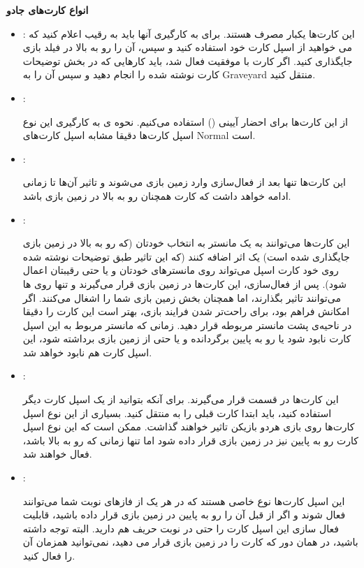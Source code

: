 \documentclass[]{article}
\begin{document}
\textbf{انواع کارت‌های جادو}

\begin{itemize}
	\item {}:
این کارت‌ها یکبار مصرف هستند. برای به کارگیری آنها باید به رقیب اعلام کنید که می خواهید از اسپل کارت خود استفاده کنید و سپس، آن را رو به بالا در فیلد بازی جایگذاری کنید. اگر کارت با موفقیت فعال شد، باید کارهایی که در بخش توضیحات کارت نوشته شده را انجام دهید و سپس آن را به Graveyard منتقل کنید.
	
	 \item {}:
	 
	 از این کارت‌ها برای احضار آیینی ()  استفاده می‌کنیم. نحوه ی به کارگیری این نوع اسپل کارت‌ها دقیقا مشابه اسپل کارت‌های Normal است.
	 
	 \item {}: 
	 
	 این کارت‌ها تنها بعد از فعال‌سازی وارد زمین بازی می‌شوند و تاثیر آن‌ها تا زمانی ادامه خواهد داشت که کارت همچنان رو به بالا در زمین بازی باشد.
	 
	 \item {}:
	 
	 این کارت‌ها می‌توانند به یک مانستر به انتخاب خودتان (که رو به بالا در زمین بازی جایگذاری شده است) یک اثر اضافه کنند (که این تاثیر طبق توضیحات نوشته شده روی خود کارت اسپل می‌تواند روی مانستر‌های خودتان و یا حتی رقیبتان اعمال شود).
	 پس از فعال‌سازی، این کارت‌ها در زمین بازی قرار می‌گیرند و تنها روی  ها می‌توانند تاثیر بگذارند، اما همچنان بخش   زمین بازی شما را اشغال می‌کنند.
	 اگر امکانش فراهم بود، برای راحت‌تر شدن فرایند بازی، بهتر است این کارت را دقیقا در ناحیه‌ی پشت مانستر مربوطه قرار دهید. زمانی که مانستر مربوط به این اسپل کارت نابود شود یا رو به پایین برگردانده و یا حتی از زمین بازی برداشته شود، این اسپل کارت هم نابود خواهد شد.
	 
	 
	 \item {}:
	 
	 این کارت‌ها در قسمت  قرار می‌گیرند. برای آنکه بتوانید از یک اسپل کارت  دیگر استفاده کنید، باید ابتدا کارت قبلی را به  منتقل کنید.
	 بسیاری از این نوع اسپل کارت‌ها روی بازی هردو بازیکن تاثیر خواهند گذاشت. ممکن است که این نوع اسپل کارت رو به پایین نیز در زمین بازی قرار داده شود اما تنها زمانی که رو به بالا باشد، فعال خواهند شد.
	 
	
	\item {}:
	
	این اسپل کارت‌ها نوع خاصی هستند که در هر یک از فازهای نوبت شما می‌توانند فعال شوند و  اگر از قبل آن را رو به پایین در زمین بازی قرار داده باشید، قابلیت فعال سازی این اسپل کارت را حتی در نوبت حریف هم دارید. البته توجه داشته باشید، در همان دور که کارت را در زمین بازی قرار می دهید، نمی‌توانید همزمان آن را فعال کنید.
	
	
\end{itemize}
\end{document}
